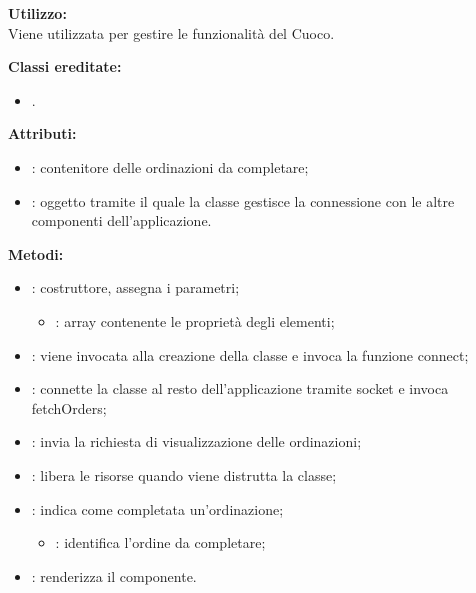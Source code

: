 \textbf{Utilizzo:}\\
Viene utilizzata per gestire le funzionalità del Cuoco.

\textbf{Classi ereditate:}
\begin{itemize}
	\item {}.
\end{itemize}


\textbf{Attributi:}
\begin{itemize}
	\item {}: contenitore delle ordinazioni da completare;
	\item {}: oggetto tramite il quale la classe gestisce la connessione con le altre componenti dell'applicazione.
\end{itemize}

\textbf{Metodi:}
\begin{itemize}
	\item {}: costruttore, assegna i parametri;
	\begin{itemize}
		\item {}: array contenente le proprietà degli elementi;
	\end{itemize}
	\item {}: viene invocata alla creazione della classe e invoca la funzione connect;
	\item {}: connette la classe al resto dell'applicazione tramite socket e invoca fetchOrders;
	\item {}: invia la richiesta di visualizzazione delle ordinazioni;
	\item {}: libera le risorse quando viene distrutta la classe;
	\item {}: indica come completata un'ordinazione;
		\begin{itemize}
			\item {}: identifica l'ordine da completare;
		\end{itemize}
	\item {}: renderizza il componente.
\end{itemize}


